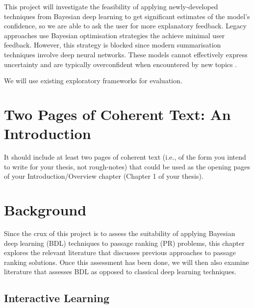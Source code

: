 \documentclass[ %
                    author={James Stephenson},
                supervisor={Dr. Edwin Simpson},
                    degree={MSc},
                     title={Project Plan: Bayesian Deep Learning For Extractive Test Summarisation},
                  subtitle={},
                      type={},
                      year={2022}]{../additions/dissertation}
\begin{document}
		This project will investigate the feasibility of applying newly-developed techniques from Bayesian deep learning \cite{Wilson20} to get significant estimates of the model's confidence, so we are able to ask the user for more explanatory feedback. Legacy approaches use Bayesian optimisation \cite{Simpson19} strategies the achieve minimal user feedback. However, this strategy is blocked since modern summarisation techniques involve deep neural networks. These models cannot effectively express uncertainty and are typically overconfident when encountered by new topics \cite{Xu19}. 
		
		We will use existing exploratory frameworks \cite{Simpson19} for evaluation. 
	
	\mainmatter
	
	 
	\chapter{Two Pages of Coherent Text: An Introduction}
	\label{chap:introduction}
		
		It should include at least two pages of coherent text (i.e., of the form you intend to write for your thesis, not rough-notes) that could be used as the opening pages of your Introduction/Overview chapter (Chapter 1 of your thesis). 
		
	
	\chapter{Background}
	\label{chap:literaturereview}
		
	Since the crux of this project is to assess the suitability of applying Bayesian deep learning (BDL) techniques to passage ranking (PR) problems, this chapter explores the relevant literature that discusses previous approaches to passage ranking solutions. Once this assessment has been done, we will then also examine literature that assesses BDL as opposed to classical deep learning techniques.
		
		\section{Interactive Learning}
		\label{chap:literaturereview:interactive}
		
\end{document}
